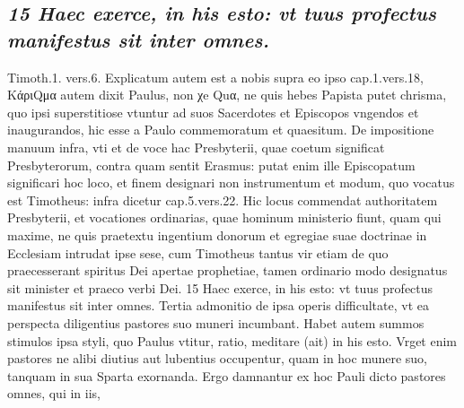 \documentclass{article}
\begin{document}
\begin{pages}
\subsection*{\textit{15 Haec exerce, in his esto: vt tuus profectus manifestus sit inter omnes.}}Timoth.1. vers.6. Explicatum autem est a nobis supra eo ipso cap.1.vers.18, ΚάριQμα autem dixit Paulus, non χe Quα, ne quis hebes Papista putet chrisma, quo ipsi superstitiose vtuntur ad suos Sacerdotes et Episcopos vngendos et inaugurandos, hic esse a Paulo commemoratum et quaesitum. De impositione manuum infra, vti et de voce hac Presbyterii, quae coetum significat Presbyterorum, contra quam sentit Erasmus: putat enim ille Episcopatum significari hoc loco, et finem designari non instrumentum et modum, quo vocatus est Timotheus: infra dicetur cap.5.vers.22. Hic locus commendat authoritatem Presbyterii, et vocationes ordinarias, quae hominum ministerio fiunt, quam qui maxime, ne quis praetextu ingentium donorum et egregiae suae doctrinae in Ecclesiam intrudat ipse sese, cum Timotheus tantus vir etiam de quo praecesserant spiritus Dei apertae prophetiae, tamen ordinario modo designatus sit minister et praeco verbi Dei. 15 Haec exerce, in his esto: vt tuus profectus manifestus sit inter omnes. Tertia admonitio de ipsa operis difficultate, vt ea perspecta diligentius pastores suo muneri incumbant. Habet autem summos stimulos ipsa styli, quo Paulus vtitur, ratio, meditare (ait) in his esto. Vrget enim pastores ne alibi diutius aut lubentius occupentur, quam in hoc munere suo, tanquam in sua Sparta exornanda. Ergo damnantur ex hoc Pauli dicto pastores omnes, qui in iis,  \pend

\end{pages}
\end{document}
